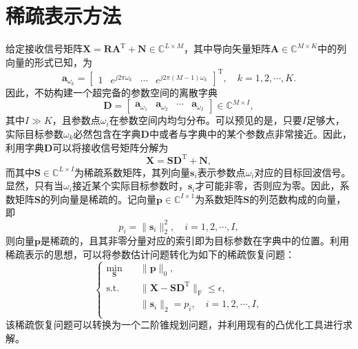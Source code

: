 \section{稀疏表示方法}

给定接收信号矩阵\( \mathbf{X} = \mathbf{R} \mathbf{A}^{\mathrm{T}}  + \mathbf{N} \in \mathbb{C}^{L \times M} \)，其中导向矢量矩阵\( \mathbf{A} \in \mathbb{C}^{M \times K} \)中的列向量的形式已知，为
\[
    \bm{a}_{\omega_k}
    = \begin{bmatrix}
        1 & e^{j2\pi\omega_k} & \cdots & e^{j2\pi(M-1)\omega_k}
    \end{bmatrix}^{\mathrm{T}}, \quad k=1,2,\cdots,K.
\]
因此，不妨构建一个超完备的参数空间的离散字典
\[
    \mathbf{D} = \begin{bmatrix}
        \bm{a}_{\omega_1} & \bm{a}_{\omega_2} & \cdots & \bm{a}_{\omega_I}
    \end{bmatrix} \in \mathbb{C}^{M \times I},
\]
其中\( I \gg K \)，且参数点\( \omega_i \)在参数空间内均匀分布。可以预见的是，只要\( I \)足够大，实际目标参数\( \omega_k \)必然包含在字典\( \mathbf{D} \)中或者与字典中的某个参数点非常接近。因此，利用字典\( \mathbf{D} \)可以将接收信号矩阵分解为
\[
    \mathbf{X} = \mathbf{S} \mathbf{D}^{\mathrm{T}} + \mathbf{N},
\]
而其中\( \mathbf{S} \in \mathbb{C}^{L \times I} \)为稀疏系数矩阵，其列向量\( \bm{s}_i \)表示参数点\( \omega_i \)对应的目标回波信号。显然，只有当\( \omega_i \)接近某个实际目标参数时，\( \bm{s}_i \)才可能非零，否则应为零。因此，系数矩阵\( \mathbf{S} \)的列向量是稀疏的。记向量\( \bm{p} \in \mathbb{C}^{I \times 1}\)为系数矩阵\( \mathbf{S} \)的列范数构成的向量，即
\[
    p_i = \|\bm{s}_i\|^2_2, \quad i=1,2,\cdots,I,
\]
则向量\( \bm{p} \)是稀疏的，且其非零分量对应的索引即为目标参数在字典中的位置。利用稀疏表示的思想，可以将参数估计问题转化为如下的稀疏恢复问题：
\[
    \begin{cases}
        \min\limits_{\mathbf{S}} \quad & \|\bm{p}\|_0,                                                                   \\
        \text{s.t.} \quad              & \|\mathbf{X} - \mathbf{S} \mathbf{D}^{\mathrm{T}}\|_{\mathrm{F}} \leq \epsilon, \\
                                       & \| \bm{s}_i \|_2 = p_i, \quad i=1,2,\cdots,I,                                   \\
    \end{cases}
\]
该稀疏恢复问题可以转换为一个二阶锥规划问题，并利用现有的凸优化工具进行求解。

